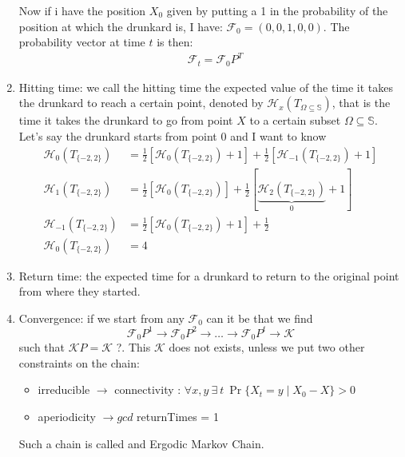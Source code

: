 \documentclass[]{article}
\begin{document}
\begin{enumerate}
	Now if i have the position $ X_0 $ given by putting a 1 in the probability of the position at which the drunkard is, I have:
	$ \mathscr{F}_0 = (0, 0, 1, 0, 0) $. The probability vector at time $ t $ is then:
	\begin{align}
	&\mathscr{F}_t = \mathscr{F}_0 P^T
	\end{align}
	\item Hitting time: we call the hitting time the expected value of the time it takes the drunkard to reach a certain point, denoted by $ \mathscr{H}_x\left(T_{\Omega\subseteq \mathbb{S}}\right) $, that is the time it takes the drunkard to go from point $ X $ to a certain subset $ \Omega \subseteq \mathbb{S} $. Let's say the drunkard starts from point 0 and I want to know
	\begin{align*}
	\mathscr{H}_0 \left(T_{\{-2, 2\}}\right) &= \frac{1}{2}\left[\mathscr{H}_0 \left(T_{\{-2, 2\}}\right) + 1 \right] + \frac{1}{2}\left[\mathscr{H}_{-1} \left(T_{\{-2, 2\}}\right) + 1 \right]\\
	\mathscr{H}_1 \left(T_{\{-2, 2\}}\right) &= \frac{1}{2}\left[\mathscr{H}_0 \left(T_{\{-2, 2\}}\right) \right] + \frac{1}{2}\left[\underbrace{\mathscr{H}_{2} \left(T_{\{-2, 2\}}\right)}_{0} + 1 \right]\\
	\mathscr{H}_{-1} \left(T_{\{-2, 2\}}\right) &= \frac{1}{2}\left[\mathscr{H}_0 \left(T_{\{-2, 2\}}\right) + 1 \right] + \frac{1}{2}\\
	\mathscr{H}_{0} \left(T_{\{-2, 2\}}\right) &= 4
	\end{align*}
	\item Return time: the expected time for a drunkard to return to the original point from where they started.
	\item Convergence: if we start from any $ \mathscr{F}_0 $ can it be that we find \[
	\mathscr{F}_0 P^1 \rightarrow \mathscr{F}_0 P^2 \rightarrow \dots \rightarrow \mathscr{F}_0 P^t \rightarrow \mathscr{K}
	\]
	such that $ \mathscr{K}P  = \mathscr{K} $  ?. This $ \mathscr{K} $ does not exists, unless we put two other constraints on the chain:
	\begin{itemize}
		\item irreducible $ \rightarrow $ connectivity : $ \forall x,y\ \exists\ t\ \Pr\{X_t = y \mid X_0 - X\} > 0 $
		\item aperiodicity  $ \rightarrow gcd $ returnTimes = 1
	\end{itemize}
	Such a chain is called and Ergodic Markov Chain.
\end{enumerate}
\end{document}
